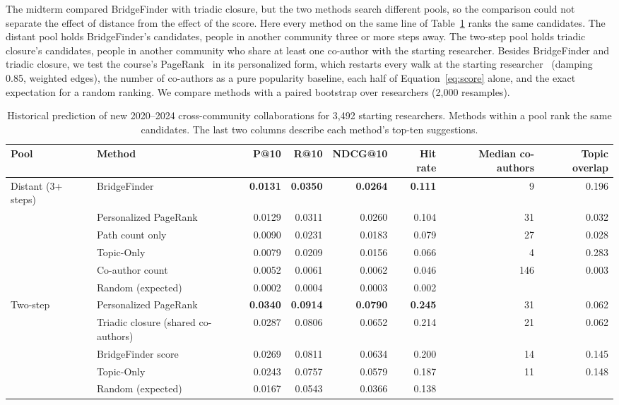 \documentclass[sigconf,nonacm]{acmart}
\begin{document}
The midterm compared BridgeFinder with triadic closure, but the two methods search different pools, so the comparison could not separate the effect of distance from the effect of the score. Here every method on the same line of Table~\ref{tab:results} ranks the same candidates. The distant pool holds BridgeFinder's candidates, people in another community three or more steps away. The two-step pool holds triadic closure's candidates, people in another community who share at least one co-author with the starting researcher. Besides BridgeFinder and triadic closure, we test the course's PageRank~\cite{brin1998,easley2010} in its personalized form, which restarts every walk at the starting researcher~\cite{haveliwala2002,gupta2013} (damping 0.85, weighted edges), the number of co-authors as a pure popularity baseline, each half of Equation~\ref{eq:score} alone, and the exact expectation for a random ranking. We compare methods with a paired bootstrap over researchers (2,000 resamples).

\begin{table}[t]
\caption{Historical prediction of new 2020--2024 cross-community collaborations for 3,492 starting researchers. Methods within a pool rank the same candidates. The last two columns describe each method's top-ten suggestions.}
\label{tab:results}
\small
\begin{tabular}{@{}llrrrrrr@{}}
\toprule
Pool & Method & P@10 & R@10 & NDCG@10 & Hit rate & Median co-authors & Topic overlap\\
\midrule
Distant (3+ steps) & BridgeFinder & \textbf{0.0131} & \textbf{0.0350} & \textbf{0.0264} & \textbf{0.111} & 9 & 0.196\\
 & Personalized PageRank & 0.0129 & 0.0311 & 0.0260 & 0.104 & 31 & 0.032\\
 & Path count only & 0.0090 & 0.0231 & 0.0183 & 0.079 & 27 & 0.028\\
 & Topic-Only & 0.0079 & 0.0209 & 0.0156 & 0.066 & 4 & 0.283\\
 & Co-author count & 0.0052 & 0.0061 & 0.0062 & 0.046 & 146 & 0.003\\
 & Random (expected) & 0.0002 & 0.0004 & 0.0003 & 0.002 & & \\
\midrule
Two-step & Personalized PageRank & \textbf{0.0340} & \textbf{0.0914} & \textbf{0.0790} & \textbf{0.245} & 31 & 0.062\\
 & Triadic closure (shared co-authors) & 0.0287 & 0.0806 & 0.0652 & 0.214 & 21 & 0.062\\
 & BridgeFinder score & 0.0269 & 0.0811 & 0.0634 & 0.200 & 14 & 0.145\\
 & Topic-Only & 0.0243 & 0.0757 & 0.0579 & 0.187 & 11 & 0.148\\
 & Random (expected) & 0.0167 & 0.0543 & 0.0366 & 0.138 & & \\
\bottomrule
\end{tabular}
\end{table}
\end{document}
